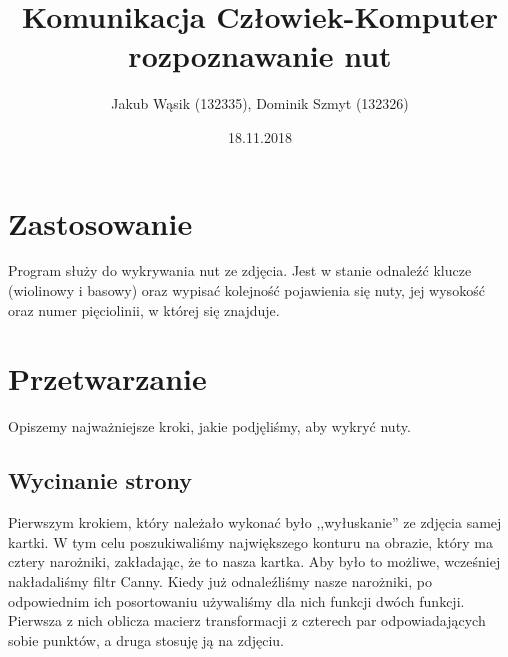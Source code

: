 \documentclass[11pt]{article}
\title{Komunikacja Człowiek-Komputer \\
rozpoznawanie nut}
\author{Jakub Wąsik (132335), Dominik Szmyt (132326)}
\date{18.11.2018}
\begin{document}
\maketitle

\section{Zastosowanie}


Program służy do wykrywania nut ze zdjęcia.
Jest w stanie odnaleźć klucze (wiolinowy i basowy) oraz wypisać kolejność pojawienia się nuty, jej wysokość oraz numer pięciolinii, w której się znajduje.  

\section{Przetwarzanie}

Opiszemy najważniejsze kroki, jakie podjęliśmy, aby wykryć nuty.

\subsection{Wycinanie strony}

Pierwszym krokiem, który należało wykonać było ,,wyłuskanie'' ze zdjęcia samej kartki. 
W tym celu poszukiwaliśmy największego konturu na obrazie, który ma cztery narożniki, zakładając, że to nasza kartka. 
Aby było to możliwe, wcześniej nakładaliśmy filtr Canny. 
Kiedy już odnaleźliśmy nasze narożniki, po odpowiednim ich posortowaniu używaliśmy dla nich funkcji dwóch funkcji. Pierwsza z nich oblicza macierz transformacji z czterech par odpowiadających sobie punktów, a druga stosuję ją na zdjęciu.
\end{document}
